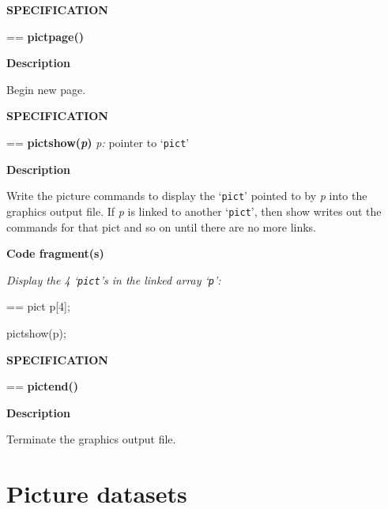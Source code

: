 \documentclass{book}
\makeatletter
\newcommand\Texinfocommandstyletextvar[1]{{\normalfont{}\textsl{#1}}}%
\newenvironment{Texinfopreformatted}{%
  \par\GNUTobeylines\obeyspaces\frenchspacing\parskip=\z@\parindent=\z@}{}
{\catcode`\^^M=13 \gdef\GNUTobeylines{\catcode`\^^M=13 \def^^M{\null\par}}}
\newenvironment{Texinfoindented}{\begin{list}{}{}\item\relax}{\end{list}}
\renewcommand{\_}{\Texinfounderscore\discretionary{}{}{}}
\makeatother
\begin{document}
\noindent{}\textbf{SPECIFICATION}
\begin{Texinfoindented}
\begin{Texinfopreformatted}%
\textbf{pict\_page()}
\end{Texinfopreformatted}
\end{Texinfoindented}
%

\noindent{}\textbf{Description}

Begin new page.

\noindent{}\textbf{SPECIFICATION}
\begin{Texinfoindented}
\begin{Texinfopreformatted}%
\textbf{pict\_show(\Texinfocommandstyletextvar{p})}
\Texinfocommandstyletextvar{p:} pointer to `\texttt{pict}'
\end{Texinfopreformatted}
\end{Texinfoindented}
%
%
%

\noindent{}\textbf{Description}

Write the picture commands to display the `\texttt{pict}' pointed to by
\Texinfocommandstyletextvar{p} into the graphics output file.
If \Texinfocommandstyletextvar{p}
is linked to another `\texttt{pict}', then show writes out the commands for that
pict and so on until there are no more links.

\noindent{}\textbf{Code fragment(s)}

\emph{Display the 4 `\texttt{pict}'s in the linked array `\texttt{p}':}
\begin{Texinfoindented}
\begin{Texinfopreformatted}%
\ttfamily pict p[4];

pict\_show(p);
\end{Texinfopreformatted}
\end{Texinfoindented}

\noindent{}\textbf{SPECIFICATION}
\begin{Texinfoindented}
\begin{Texinfopreformatted}%
\textbf{pict\_end()}
\end{Texinfopreformatted}
\end{Texinfoindented}
\noindent{}%
%

\noindent{}\textbf{Description}

Terminate the graphics output file.

\section{{Picture datasets}}
\label{anchor:Picture-datasets}%
\end{document}

